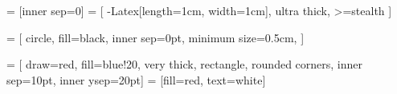 
\usepackage{mwe}
\usepackage{blindtext}
\usepackage{relsize}
\usetikzlibrary{positioning	}
\usetikzlibrary{arrows.meta}
\newcommand{\xo}{\bigotimes}


\newcommand{\macrocolor}{red}
\newcommand{\microcolor}{blue}
\newcommand{\macrotext}[1]{\color{\macrocolor}#1}
\newcommand{\microtext}[1]{\color{\microcolor}#1}

\newcommand{\FIGWIDTH}{14cm} %
\newcommand{\FIGHEIGHT}{9cm} %
\newcommand{\VERTFIGSEP}{5cm} %
\newcommand{\HORFIGSEP}{7cm} %

 = [inner sep=0]
 = [
		-{Latex[length=1cm, width=1cm]},
		ultra thick,
		>=stealth
]

 = [
		circle,
		fill=black,
		inner sep=0pt,
		minimum size=0.5cm,
]

 = [
		draw=red,
		fill=blue!20,
		very thick,
    rectangle,
		rounded corners,
		inner sep=10pt,
		inner ysep=20pt]
 = [fill=red, text=white]

